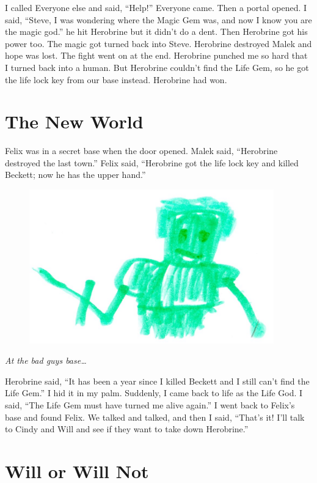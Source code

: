 \documentclass[12pt,oneside]{krantz}
\begin{document}
I called Everyone else and said, ``Help!'' Everyone came. Then a portal
opened. I said, ``Steve, I was wondering where the Magic Gem was, and
now I know you are the magic god.'' he hit Herobrine but it didn't do a
dent. Then Herobrine got his power too. The magic got turned back into
Steve. Herobrine destroyed Malek and hope was lost. The fight went on at
the end. Herobrine punched me so hard that I turned back into a human.
But Herobrine couldn't find the Life Gem, so he got the life lock key
from our base instead. Herobrine had won.

\chapter{The New World}\label{the-new-world}

Felix was in a secret base when the door opened. Malek said, ``Herobrine
destroyed the last town.'' Felix said, ``Herobrine got the life lock key
and killed Beckett; now he has the upper hand.''

\begin{figure}
\centering
\includegraphics[width=4.16667in]{img/17-greenguy.jpg}
\caption{}
\end{figure}

\emph{At the bad guys base\ldots{}}

Herobrine said, ``It has been a year since I killed Beckett and I still
can't find the Life Gem.'' I hid it in my palm. Suddenly, I came back to
life as the Life God. I said, ``The Life Gem must have turned me alive
again.'' I went back to Felix's base and found Felix. We talked and
talked, and then I said, ``That's it! I'll talk to Cindy and Will and
see if they want to take down Herobrine.''

\chapter{Will or Will Not}\label{will-or-will-not}
\end{document}
